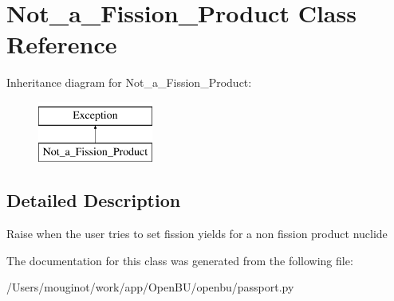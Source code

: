 \hypertarget{classopenbu_1_1passport_1_1_not__a___fission___product}{}\section{Not\+\_\+a\+\_\+\+Fission\+\_\+\+Product Class Reference}
\label{classopenbu_1_1passport_1_1_not__a___fission___product}
Inheritance diagram for Not\+\_\+a\+\_\+\+Fission\+\_\+\+Product\+:\begin{figure}[H]
\begin{center}
\leavevmode
\includegraphics[height=2.000000cm]{classopenbu_1_1passport_1_1_not__a___fission___product}
\end{center}
\end{figure}


\subsection{Detailed Description}
\begin{DoxyVerb}Raise when the user tries to set fission yields for a non fission product nuclide \end{DoxyVerb}
 

The documentation for this class was generated from the following file\+:\begin{DoxyCompactItemize}
\item 
/\+Users/mouginot/work/app/\+Open\+B\+U/openbu/passport.\+py\end{DoxyCompactItemize}
